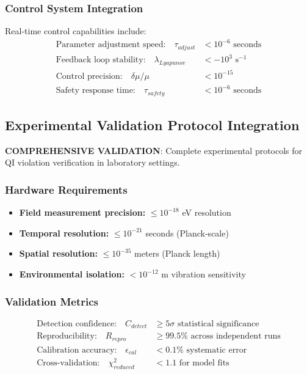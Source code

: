 \documentclass[11pt]{article}
\begin{document}
\subsubsection{Control System Integration}
Real-time control capabilities include:
\begin{align}
\text{Parameter adjustment speed:} \quad \tau_{adjust} &< 10^{-6} \text{ seconds} \\
\text{Feedback loop stability:} \quad \lambda_{Lyapunov} &< -10^3 \text{ s}^{-1} \\
\text{Control precision:} \quad \delta\mu/\mu &< 10^{-15} \\
\text{Safety response time:} \quad \tau_{safety} &< 10^{-6} \text{ seconds}
\end{align}

\subsection{Experimental Validation Protocol Integration}
\textbf{COMPREHENSIVE VALIDATION}: Complete experimental protocols for QI violation verification in laboratory settings.

\subsubsection{Hardware Requirements}
\begin{itemize}
\item \textbf{Field measurement precision:} $\leq 10^{-18}$ eV resolution
\item \textbf{Temporal resolution:} $\leq 10^{-21}$ seconds (Planck-scale)
\item \textbf{Spatial resolution:} $\leq 10^{-35}$ meters (Planck length)
\item \textbf{Environmental isolation:} $< 10^{-12}$ m vibration sensitivity
\end{itemize}

\subsubsection{Validation Metrics}
\begin{align}
\text{Detection confidence:} \quad C_{detect} &\geq 5\sigma \text{ statistical significance} \\
\text{Reproducibility:} \quad R_{repro} &\geq 99.5\% \text{ across independent runs} \\
\text{Calibration accuracy:} \quad \epsilon_{cal} &< 0.1\% \text{ systematic error} \\
\text{Cross-validation:} \quad \chi^2_{reduced} &< 1.1 \text{ for model fits}
\end{align}
\end{document}
